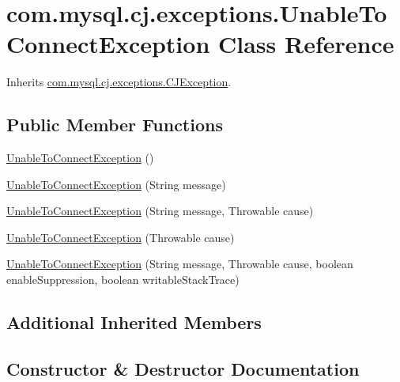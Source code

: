 \hypertarget{classcom_1_1mysql_1_1cj_1_1exceptions_1_1_unable_to_connect_exception}{}\section{com.\+mysql.\+cj.\+exceptions.\+Unable\+To\+Connect\+Exception Class Reference}
\label{classcom_1_1mysql_1_1cj_1_1exceptions_1_1_unable_to_connect_exception}


Inherits \mbox{\hyperlink{classcom_1_1mysql_1_1cj_1_1exceptions_1_1_c_j_exception}{com.\+mysql.\+cj.\+exceptions.\+C\+J\+Exception}}.

\subsection*{Public Member Functions}
\begin{DoxyCompactItemize}
\item 
\mbox{\hyperlink{classcom_1_1mysql_1_1cj_1_1exceptions_1_1_unable_to_connect_exception_afa1181deb4fe24f7c58a1f5d1b5b24c2}{Unable\+To\+Connect\+Exception}} ()
\item 
\mbox{\hyperlink{classcom_1_1mysql_1_1cj_1_1exceptions_1_1_unable_to_connect_exception_ab8e62b13382c808668c18de7e5e854df}{Unable\+To\+Connect\+Exception}} (String message)
\item 
\mbox{\hyperlink{classcom_1_1mysql_1_1cj_1_1exceptions_1_1_unable_to_connect_exception_a8a28b5beb52cb2afb610d58193daaf2e}{Unable\+To\+Connect\+Exception}} (String message, Throwable cause)
\item 
\mbox{\hyperlink{classcom_1_1mysql_1_1cj_1_1exceptions_1_1_unable_to_connect_exception_ad11803fe01101d0e8fc73f6f565567d4}{Unable\+To\+Connect\+Exception}} (Throwable cause)
\item 
\mbox{\hyperlink{classcom_1_1mysql_1_1cj_1_1exceptions_1_1_unable_to_connect_exception_ace56ab56fc7d8fd525f564df5fed9c7c}{Unable\+To\+Connect\+Exception}} (String message, Throwable cause, boolean enable\+Suppression, boolean writable\+Stack\+Trace)
\end{DoxyCompactItemize}
\subsection*{Additional Inherited Members}


\subsection{Constructor \& Destructor Documentation}
\mbox{\label{classcom_1_1mysql_1_1cj_1_1exceptions_1_1_unable_to_connect_exception_afa1181deb4fe24f7c58a1f5d1b5b24c2}} 

